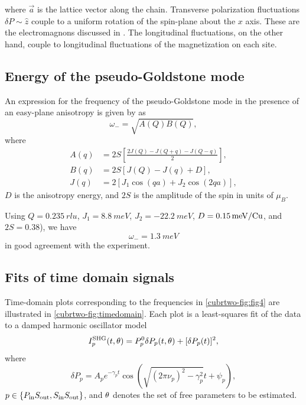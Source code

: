 where $\vec a$ is the lattice vector along the chain.
Transverse polarization fluctuations $\delta P \sim \hat z$ couple to a uniform rotation of the spin-plane about the $x$ axis.
These are the electromagnons discussed in \citet{katsura_dynamical_2007}.
The longitudinal fluctuations, on the other hand, couple to longitudinal fluctuations of the magnetization on each site.

\subsection{Energy of the pseudo-Goldstone mode}\label{cubrtwo-sup:anisotropyenergy}
An expression for the frequency of the pseudo-Goldstone mode in the presence of an easy-plane anisotropy is given by \citet{katsura_dynamical_2007} as
\begin{equation}
\omega_- = \sqrt{A(Q)B(Q)},
\end{equation}
where
\begin{align}
A(q) &= 2S\left[\frac{2J(Q)-J(Q+q)-J(Q-q)}{2}\right],\\
B(q) &= 2S\left[J(Q)-J(q)+D\right],\\
J(q) &= 2\left[J_1\cos(qa)+J_2\cos(2qa)\right],
\end{align}
$D$ is the anisotropy energy, and $2S$ is the amplitude of the spin in units of $\mu_B$.

Using $Q=\qty{0.235}{rlu}$\citep{zhao_cubr2_2012}, $J_1=\qty{8.8}{meV}$\citep{lebernegg_magnetism_2013}, $J_2=\qty{-22.2}{meV}$\citep{lebernegg_magnetism_2013}, $D=\qty{0.15}{meV/\ce{Cu}}$\citep{lee_investigation_2012}, and $2S=\num{0.38}$\citep{lee_investigation_2012}), we have
\begin{equation}
\omega_- = \qty{1.3}{meV}
\end{equation}
in good agreement with the experiment.

\subsection{Fits of time domain signals}\label{cubrtwo-sup:timedomain}
Time-domain plots corresponding to the frequencies in \cref{cubrtwo-fig:fig4} are illustrated in \cref{cubrtwo-fig:timedomain}.
Each plot is a least-squares fit of the data to a damped harmonic oscillator model
\begin{equation}
I^\mathrm{SHG}_p(t, \theta) = P^0_p\delta P_p(t, \theta)+[\delta P_p(t)]^2,
\end{equation}
where
\begin{equation}\label{cubrtwo-eq:model}
\delta P_p = A_pe^{-\gamma_p t}\cos\left(\sqrt{(2\pi\nu_p)^2-\gamma_p^2}t+\psi_p\right),
\end{equation}
$p \in \{P_\mathrm{in}S_\mathrm{out}, S_\mathrm{in}S_\mathrm{out}\}$, and $\theta$ denotes the set of free parameters to be estimated.

